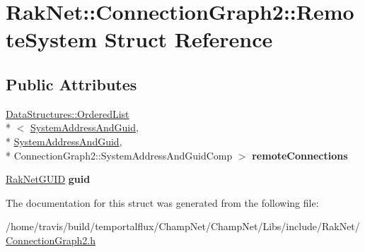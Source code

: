 \hypertarget{struct_rak_net_1_1_connection_graph2_1_1_remote_system}{\section{Rak\-Net\-:\-:Connection\-Graph2\-:\-:Remote\-System Struct Reference}
\label{struct_rak_net_1_1_connection_graph2_1_1_remote_system}
}
\subsection*{Public Attributes}
\begin{DoxyCompactItemize}
\item 
\hypertarget{struct_rak_net_1_1_connection_graph2_1_1_remote_system_a34ade1d378f31b184393377915873918}{\hyperlink{class_data_structures_1_1_ordered_list}{Data\-Structures\-::\-Ordered\-List}\\*
$<$ \hyperlink{struct_rak_net_1_1_connection_graph2_1_1_system_address_and_guid}{System\-Address\-And\-Guid}, \\*
\hyperlink{struct_rak_net_1_1_connection_graph2_1_1_system_address_and_guid}{System\-Address\-And\-Guid}, \\*
Connection\-Graph2\-::\-System\-Address\-And\-Guid\-Comp $>$ {\bfseries remote\-Connections}}\label{struct_rak_net_1_1_connection_graph2_1_1_remote_system_a34ade1d378f31b184393377915873918}

\item 
\hypertarget{struct_rak_net_1_1_connection_graph2_1_1_remote_system_ab423720c4ac1f052c6ff494acb8bfcee}{\hyperlink{struct_rak_net_1_1_rak_net_g_u_i_d}{Rak\-Net\-G\-U\-I\-D} {\bfseries guid}}\label{struct_rak_net_1_1_connection_graph2_1_1_remote_system_ab423720c4ac1f052c6ff494acb8bfcee}

\end{DoxyCompactItemize}


The documentation for this struct was generated from the following file\-:\begin{DoxyCompactItemize}
\item 
/home/travis/build/temportalflux/\-Champ\-Net/\-Champ\-Net/\-Libs/include/\-Rak\-Net/\hyperlink{_connection_graph2_8h}{Connection\-Graph2.\-h}\end{DoxyCompactItemize}
